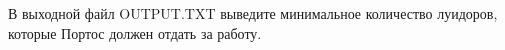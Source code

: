 В выходной файл OUTPUT.TXT выведите минимальное количество луидоров, которые Портос должен отдать за работу.